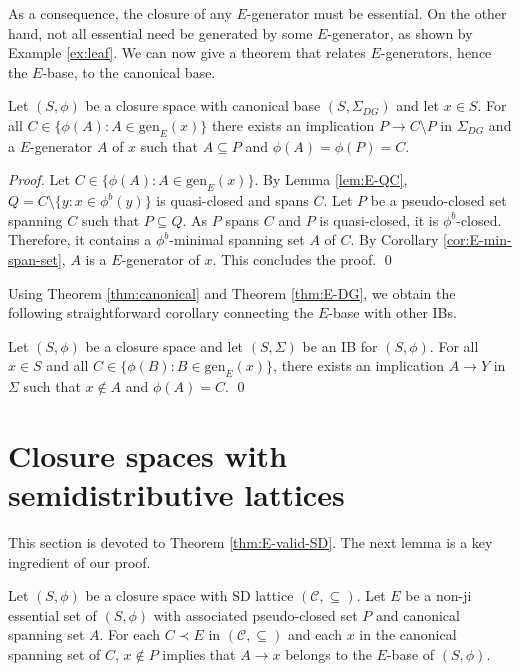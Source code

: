 \documentclass[12pt, a4paper]{article}
\def\arxiv{1}
\newcommand{\cc}[1]{\mathcal{#1}}  %
\newcommand{\st}{:}  %
\newcommand{\U}{S}  %
\newcommand{\SD}{\mathrm{SD}}  %
\newcommand{\cl}{\phi}  %
\newcommand{\cs}{\cc{C}} %
\newcommand{\gen}{\mathrm{gen}}  %
\newcommand{\imp}{\rightarrow}  %
\newcommand{\is}{\Sigma}  %
\begin{document}
As a consequence, the closure of any $E$-generator must be essential.
On the other hand, not all essential need be generated by some $E$-generator, as shown by Example \ref{ex:leaf}.
We can now give a theorem that relates $E$-generators, hence the $E$-base, to the canonical base.

\begin{theorem} \label{thm:E-DG}
Let $(\U, \cl)$ be a closure space with canonical base $(\U, \is_{DG})$ and let $x \in \U$.
For all $C \in \{\cl(A) \st A \in \gen_E(x)\}$ there exists an implication $P \imp C \setminus P$ in $\is_{DG}$ and a $E$-generator $A$ of $x$ such that $A \subseteq P$ and $\cl(A) = \cl(P) = C$.
\end{theorem}

\begin{proof}
Let $C \in \{\cl(A) \st A \in \gen_E(x)\}$.
By Lemma \ref{lem:E-QC}, $Q = C \setminus \{y \st x \in \cl^b(y)\}$ is quasi-closed and spans $C$.
Let $P$ be a pseudo-closed set spanning $C$ such that $P \subseteq Q$.
As $P$ spans $C$ and $P$ is quasi-closed, it is $\cl^b$-closed.
Therefore, it contains a $\cl^b$-minimal spanning set $A$ of $C$. 
By Corollary \ref{cor:E-min-span-set}, $A$ is a $E$-generator of $x$.
This concludes the proof.
\ifx\arxiv\undefined
\qed
\fi
\end{proof}

Using Theorem \ref{thm:canonical} and Theorem \ref{thm:E-DG}, we obtain the following straightforward corollary connecting the $E$-base with other IBs.

\begin{corollary} \label{cor:E-IB}
Let $(\U, \cl)$ be a closure space and let $(\U, \is)$ be an IB for $(\U, \cl)$.
For all $x \in \U$ and all $C \in \{\cl(B) \st B \in \gen_E(x)\}$, there exists an implication $A \imp Y$ in $\is$ such that $x \notin A$ and $\cl(A) = C$.
\qed
\end{corollary}


\section{Closure spaces with semidistributive lattices} \label{sec:proof}

This section is devoted to Theorem \ref{thm:E-valid-SD}.
The next lemma is a key ingredient of our proof.

\begin{lemma} \label{lem:pseudo-E}
Let $(\U, \cl)$ be a closure space with $\SD$ lattice $(\cs, \subseteq)$.
Let $E$ be a non-ji essential set of $(\U, \cl)$ with associated pseudo-closed set $P$ and canonical spanning set $A$.
For each $C \prec E$ in $(\cs, \subseteq)$ and each $x$ in the canonical spanning set of $C$, $x \notin P$ implies that $A \imp x$ belongs to the $E$-base of $(\U, \cl)$.
\end{lemma}
\end{document}
